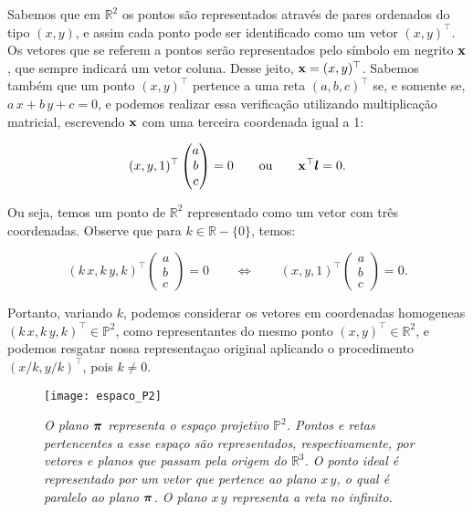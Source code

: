 Sabemos que em $\mathbb{R}^{2}$ os pontos são representados através de pares ordenados do tipo $(x,y)$, e assim cada ponto pode ser identificado como um vetor $(x,y)^\top$. Os vetores que se referem a pontos serão representados pelo símbolo em negrito $\mathbf{x}$, que sempre indicará um vetor coluna. Desse jeito, $\mathbf{x}=(x,y)^\top$. Sabemos também que um ponto $(x,y)^\top$ pertence a uma reta $(a,b,c)^\top$ se, e somente se, $a\,x+b\,y+c=0$, e podemos realizar essa verificação utilizando multiplicação matricial, escrevendo $\mathbf{x}$ com uma terceira coordenada igual a 1:

\begin{equation*}
(x,y,1)^\top 
\begin{pmatrix}
 a  \\ 
 b  \\ 
 c 
 \end{pmatrix} 
 = 0 \qquad 
 \text{ou} 
 \qquad \mathbf{x} ^\top\boldsymbol{l} = 0.
\end{equation*}

Ou seja, temos um ponto de $\mathbb{R}^{2}$ representado como um vetor com três coordenadas. Observe que para $k \in \mathbb{R} - \{0\}$, temos:

\begin{equation*}
(k\,x,k\,y,k)^\top 
\begin{pmatrix}
 a  \\ 
 b  \\ 
 c 
 \end{pmatrix} 
 = 0
 \qquad \Leftrightarrow \qquad
 (x,y,1)^\top
\begin{pmatrix}
 a  \\ 
 b  \\ 
 c 
 \end{pmatrix} 
 = 0.
\end{equation*}

Portanto,  variando $k$, podemos considerar os vetores em coordenadas homogeneas $(k\,x,k\,y,k)^\top \in \mathbb{P}^2$, como representantes do mesmo ponto $(x,y)^\top \in \mathbb{R}^2$, e podemos resgatar nossa representaçao original aplicando o procedimento $(x/k,y/k)^\top$, pois $k \ne 0$.

\begin{figure}[!htb]
\centering
\texttt{[image: espaco\_P2]}
\caption{\textit{O plano $\boldsymbol{\pi}$ representa o espaço projetivo $\mathbb{P}^2$. Pontos e retas pertencentes a esse espaço são representados, respectivamente, por vetores e planos que passam pela origem do $\mathbb{R}^3$. O ponto ideal é representado por um vetor que pertence ao plano $x\,y$, o qual é paralelo ao plano $\boldsymbol{\pi}$. O plano $x\,y$ representa a reta no infinito.}}
\label{plano_P2}
\end{figure}

